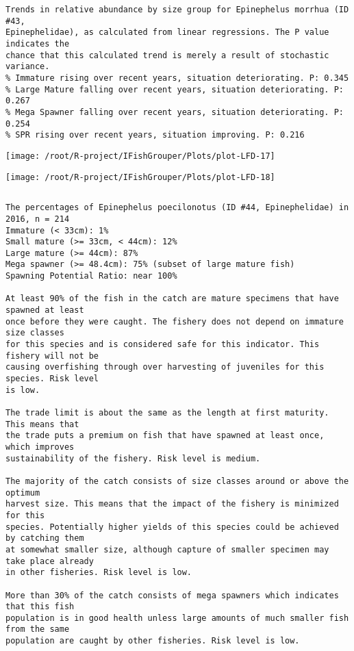 \documentclass{report}\usepackage[]{graphicx}\usepackage[]{color}
\makeatletter
\def\maxwidth{ %
  \ifdim\Gin@nat@width>\linewidth
    \linewidth
  \else
    \Gin@nat@width
  \fi
}
\newenvironment{kframe}{%
 \def\at@end@of@kframe{}%
 \ifinner\ifhmode%
  \def\at@end@of@kframe{\end{minipage}}%
  \begin{minipage}{\columnwidth}%
 \fi\fi%
 \def\FrameCommand##1{\hskip\@totalleftmargin \hskip-\fboxsep
 \colorbox{shadecolor}{##1}\hskip-\fboxsep
     \hskip-\linewidth \hskip-\@totalleftmargin \hskip\columnwidth}%
 \MakeFramed {\advance\hsize-\width
   \@totalleftmargin\z@ \linewidth\hsize
   \@setminipage}}%
 {\par\unskip\endMakeFramed%
 \at@end@of@kframe}
\newenvironment{knitrout}{}{} %
\makeatother
\begin{document}
\begin{knitrout}
\begin{kframe}
\begin{verbatim}
Trends in relative abundance by size group for Epinephelus morrhua (ID #43,
Epinephelidae), as calculated from linear regressions. The P value indicates the
chance that this calculated trend is merely a result of stochastic variance.
% Immature rising over recent years, situation deteriorating. P: 0.345
% Large Mature falling over recent years, situation deteriorating. P: 0.267
% Mega Spawner falling over recent years, situation deteriorating. P: 0.254
% SPR rising over recent years, situation improving. P: 0.216
\end{verbatim}
\end{kframe}
\texttt{[image: /root/R-project/IFishGrouper/Plots/plot-LFD-17]} 

\texttt{[image: /root/R-project/IFishGrouper/Plots/plot-LFD-18]} 
\begin{kframe}\begin{verbatim}
\end{verbatim}
\end{kframe}
\clearpage
\newpage
\begin{kframe}\begin{verbatim}The percentages of Epinephelus poecilonotus (ID #44, Epinephelidae) in 2016, n = 214
Immature (< 33cm): 1%
Small mature (>= 33cm, < 44cm): 12%
Large mature (>= 44cm): 87%
Mega spawner (>= 48.4cm): 75% (subset of large mature fish)
Spawning Potential Ratio: near 100%
 
At least 90% of the fish in the catch are mature specimens that have spawned at least
once before they were caught. The fishery does not depend on immature size classes
for this species and is considered safe for this indicator. This fishery will not be
causing overfishing through over harvesting of juveniles for this species. Risk level
is low.

The trade limit is about the same as the length at first maturity.  This means that
the trade puts a premium on fish that have spawned at least once, which improves
sustainability of the fishery. Risk level is medium.

The majority of the catch consists of size classes around or above the optimum
harvest size. This means that the impact of the fishery is minimized for this
species. Potentially higher yields of this species could be achieved by catching them
at somewhat smaller size, although capture of smaller specimen may take place already
in other fisheries. Risk level is low.

More than 30% of the catch consists of mega spawners which indicates that this fish
population is in good health unless large amounts of much smaller fish from the same
population are caught by other fisheries. Risk level is low.
 

\end{verbatim}
\end{kframe}
\end{knitrout}
\end{document}
